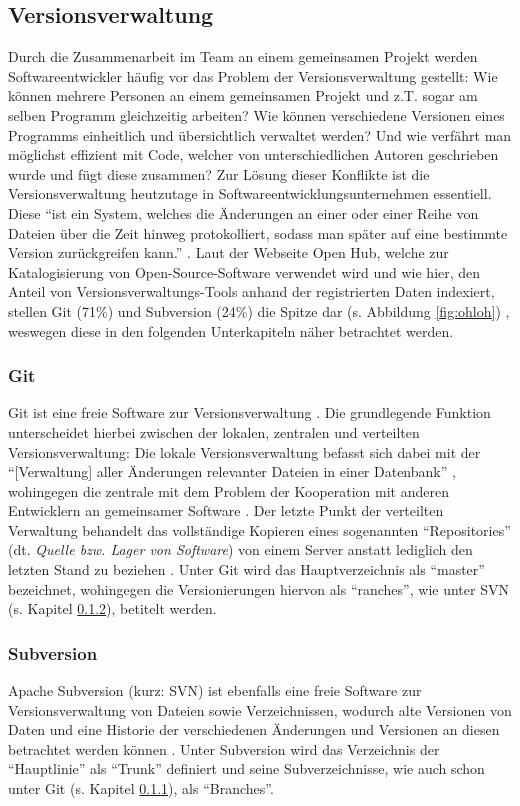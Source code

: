 \subsection{Versionsverwaltung}
Durch die Zusammenarbeit im Team an einem gemeinsamen Projekt werden Softwareentwickler häufig vor das Problem der Versionsverwaltung gestellt: Wie können mehrere Personen an einem gemeinsamen Projekt und z.T. sogar am selben Programm gleichzeitig arbeiten?
Wie können verschiedene Versionen eines Programms einheitlich und übersichtlich verwaltet werden? Und wie verfährt man möglichst effizient mit Code, welcher von unterschiedlichen Autoren geschrieben wurde und fügt diese zusammen? Zur Lösung dieser Konflikte 
ist die Versionsverwaltung heutzutage in Softwareentwicklungsunternehmen essentiell. Diese \enquote{ist ein System, welches die Änderungen an einer oder einer Reihe von Dateien über die Zeit hinweg protokolliert, sodass man später auf eine bestimmte Version 
zurückgreifen kann.} \cite{Scott-Chacon:2020aa}. Laut der Webseite Open Hub, welche zur Katalogisierung von Open-Source-Software verwendet wird und wie hier, den Anteil von Versionsverwaltungs-Tools anhand der registrierten Daten indexiert, stellen Git (71\%) 
und Subversion (24\%) die Spitze dar (s. Abbildung \ref{fig:ohloh}) \cite{Inc.:2020aa}, weswegen diese in den folgenden Unterkapiteln näher betrachtet werden.

\subsubsection{Git} \label{git}
Git ist eine freie Software zur Versionsverwaltung \cite{Git:2020aa}. Die grundlegende Funktion unterscheidet hierbei zwischen der lokalen, zentralen und verteilten Versionsverwaltung: Die lokale Versionsverwaltung befasst sich dabei mit der \enquote{[Verwaltung] aller Änderungen relevanter Dateien in einer Datenbank} \cite{Scott-Chacon:2020aa}, wohingegen die
zentrale mit dem Problem der Kooperation mit anderen Entwicklern an gemeinsamer Software \cite{Scott-Chacon:2020aa}. Der letzte Punkt der verteilten Verwaltung behandelt das vollständige Kopieren eines sogenannten \enquote{Repositories} (dt. \textit{Quelle bzw. Lager von Software})
von einem Server anstatt lediglich den letzten Stand zu beziehen \cite{Scott-Chacon:2020aa}. Unter Git wird das Hauptverzeichnis als \enquote{master} bezeichnet, wohingegen die Versionierungen hiervon als \enquote{ranches}, wie unter SVN (s. Kapitel \ref{svn}), betitelt werden.

\subsubsection{Subversion} \label{svn}
Apache Subversion (kurz: SVN) ist ebenfalls eine freie Software zur Versionsverwaltung von Dateien sowie Verzeichnissen, wodurch alte Versionen von Daten und eine Historie der verschiedenen Änderungen und Versionen an diesen betrachtet werden können \cite{Collins-Sussman:2004aa}.
Unter Subversion wird das Verzeichnis der \enquote{Hauptlinie} als \enquote{Trunk} definiert und seine Subverzeichnisse, wie auch schon unter Git (s. Kapitel \ref{git}), als \enquote{Branches}.